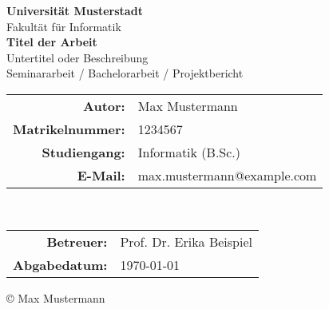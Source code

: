 \begin{titlepage}
    \centering
    \vspace*{2cm}

    {\Large \textbf{Universität Musterstadt}}\\[0.5cm]
    {\large Fakultät für Informatik}\\[4cm]

    {\Huge \textbf{Titel der Arbeit}}\\[1cm]
    {\Large Untertitel oder Beschreibung}\\[2cm]

    {\large Seminararbeit / Bachelorarbeit / Projektbericht}\\[0.5cm]

    \vfill
    \begin{tabular}{rl}
        \textbf{Autor:} & Max Mustermann \\
        \textbf{Matrikelnummer:} & 1234567 \\
        \textbf{Studiengang:} & Informatik (B.Sc.) \\
        \textbf{E-Mail:} & max.mustermann@example.com \\
    \end{tabular}\\[1.5cm]

    \begin{tabular}{rl}
        \textbf{Betreuer:} & Prof. Dr. Erika Beispiel \\
        \textbf{Abgabedatum:} & \today \\
    \end{tabular}

    \vfill
    {\small © \the\year{} Max Mustermann}

\end{titlepage}
